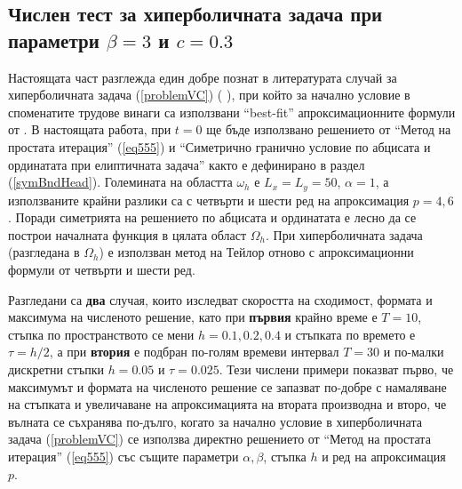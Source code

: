 \documentclass{article}
\newcommand{\rf}[1]{(\ref{#1})}
\theoremstyle{remark}
\begin{document}
\subsection{Числен тест за хиперболичната задача при параметри $\beta = 3$ и $c=0.3$} \label{numTestbt3c03}
Настоящата част разглежда един добре познат в литературата случай за хиперболичната задача \rf{problemVC} ( \cite{ref21, dani, milenaDani, ref22} ), при който за начално условие в споменатите трудове винаги са използвани ``best-fit'' апроксимационните формули от \cite{Ch2011}. В настоящата работа, при $t=0$ ще бъде използвано решението от ``Метод на простата итерация'' \rf{eq555} и  ``Симетрично гранично условие по абцисата и ординатата при елиптичната задача'' както е дефинирано в раздел \rf{symBndHead}. Големината на областта $\omega_h$ е $L_x = L_y = 50$, $\alpha = 1$, а използваните крайни разлики са с четвърти и шести ред на апроксимация $p=4, 6$. Поради симетрията на решението по абцисата и ординатата е лесно да се построи началната функция в цялата област $\Omega_h$. При хиперболичната задача (разгледана в $\Omega_h$) е използван метод на Тейлор отново с апроксимационни формули от четвърти и шести ред.

Разгледани са \textbf{два} случая, които изследват скоростта на сходимост, формата и максимума на численото решение, като при \textbf{първия} крайно време е {\boldmath $T=10$}, стъпка по пространството се мени {\boldmath $h=0.1, 0.2, 0.4$} и стъпката по времето е $\tau = h/2$, а при \textbf{втория} е подбран по-голям времеви интервал {\boldmath $T=30$} и по-малки дискретни стъпки {\boldmath $h=0.05$} и {\boldmath $\tau=0.025$}. Тези числени примери показват първо, че максимумът и формата на численото решение се запазват по-добре с намаляване на стъпката и увеличаване на апроксимацията на втората производна и второ, че вълната се съхранява по-дълго, когато за начално условие в хиперболичната задача \rf{problemVC} се използва директно решението от ``Метод на простата итерация'' \rf{eq555} със същите параметри $\alpha, \beta$, стъпка $h$ и ред на апроксимация $p$.
\end{document}

